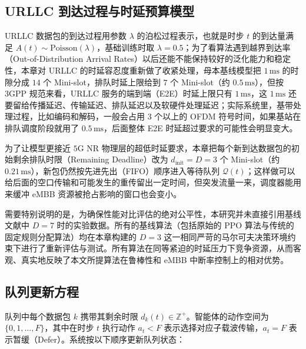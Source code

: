 \subsection{URLLC 到达过程与时延预算模型}\label{321-urllc-ux5230ux8fbeux8fc7ux7a0bux4e0eux65f6ux5ef6ux9884ux7b97ux6a21ux578b}

URLLC 数据包的到达过程用参数 \(\lambda\) 的泊松过程表示，也就是时步 \(t\) 的到达量满足 \(A(t) \sim \text{Poisson}(\lambda)\)，基础训练时取 \(\lambda = 0.5\)；为了看算法遇到越界到达率（Out-of-Distribution Arrival Rates）以后还能不能保持较好的泛化能力和稳定性，本章对 URLLC 的时延容忍度重新做了收紧处理，母本基线模型把 \(1\,\text{ms}\) 的时隙分成 \(14\) 个 Mini-slot，排队时延上限给到 \(7\) 个 Mini-slot（约 \(0.5\,\text{ms}\)），但按 \(3\text{GPP}\) 规范来看，URLLC 服务的端到端（E2E）时延上限只有 \(1\,\text{ms}\)，这 \(1\,\text{ms}\) 还要留给传播延迟、传输延迟、排队延迟以及软硬件处理延迟\cite{truong2026}；实际系统里，基带处理过程，比如编码和解码，一般会占用 \(3\) 个以上的 OFDM 符号时间\cite{esswie2018}，如果基站在排队调度阶段就用了 \(0.5\,\text{ms}\)，后面整体 E2E 时延超过要求的可能性会明显变大。

为了让模型更接近 \(5\text{G NR}\) 物理层的超低时延要求，本章把每个新到达数据包的初始剩余排队时限（Remaining Deadline）改为 \(d_{\text{init}} = D = 3\) 个 Mini-slot（约 \(0.21\,\text{ms}\)），新包仍然按先进先出（FIFO）顺序进入等待队列 \(\mathcal{Q}(t)\)；这样做可以给后面的空口传输和可能发生的重传留出一定时间，但突发流量一来，调度器能用来缓冲 eMBB 资源被抢占影响的窗口也会变小。

需要特别说明的是，为确保性能对比评估的绝对公平性，本研究并未直接引用基线文献中 $D=7$ 时的实验数据。所有的基线算法（包括原始的 PPO 算法与传统的固定规则分配算法）均在本章构建的 $D=3$ 这一相同严苛的马尔可夫决策环境约束下进行了重新评估与测试。所有算法在同等紧迫的时延压力下竞争资源，从而客观、真实地反映了本文所提算法在鲁棒性和 eMBB 中断率控制上的相对优势。









\subsection{队列更新方程}\label{322-ux961fux5217ux66f4ux65b0ux65b9ux7a0b}

队列中每个数据包 \(k\) 携带其剩余时限 \(d_k(t) \in \mathbb{Z}^+\)。智能体的动作空间为 \(\{0, 1, \dots, F\}\)，其中在时步 \(t\) 执行动作 \(a_t < F\) 表示选择对应子载波传输，\(a_t = F\) 表示暂缓（Defer）\cite{saggese2021}。系统按以下顺序更新队列状态：

